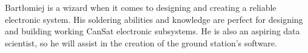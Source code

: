 \documentclass[class=report, crop=false]{standalone}
\begin{document}
Bartłomiej is a wizard when it comes to designing and creating a reliable electronic system.
His soldering abilities and knowledge are perfect for designing and building working CanSat electronic subsystems.
He is also an aspiring data scientist, so he will assist in the creation of the ground station's software.
\end{document}

